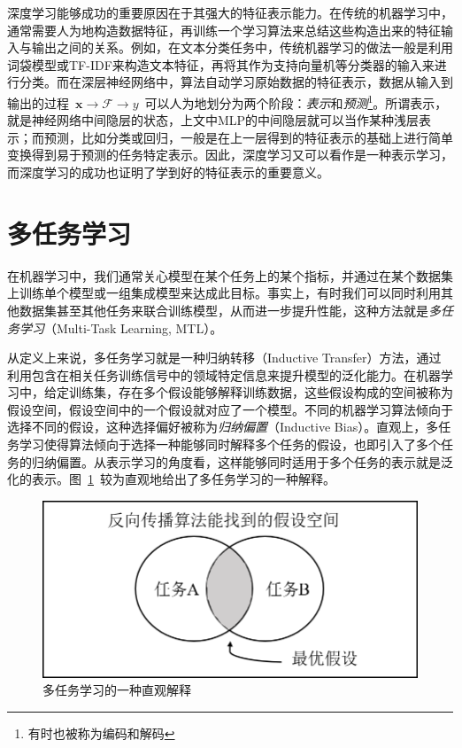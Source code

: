 深度学习能够成功的重要原因在于其强大的特征表示能力。在传统的机器学习中，通常需要人为地构造数据特征，再训练一个学习算法来总结这些构造出来的特征输入与输出之间的关系。例如，在文本分类任务中，传统机器学习的做法一般是利用词袋模型或TF-IDF来构造文本特征，再将其作为支持向量机等分类器的输入来进行分类。而在深层神经网络中，算法自动学习原始数据的特征表示，数据从输入到输出的过程~$\mathbf{x}\to \mathcal{F} \to y$~可以人为地划分为两个阶段：\emph{表示}和\emph{预测}\footnote{有时也被称为编码和解码}。所谓表示，就是神经网络中间隐层的状态，上文中MLP的中间隐层就可以当作某种浅层表示；而预测，比如分类或回归，一般是在上一层得到的特征表示的基础上进行简单变换得到易于预测的任务特定表示。因此，深度学习又可以看作是一种表示学习，而深度学习的成功也证明了学到好的特征表示的重要意义。

\section{多任务学习}
\label{sec:mtl}
在机器学习中，我们通常关心模型在某个任务上的某个指标，并通过在某个数据集上训练单个模型或一组集成模型来达成此目标。事实上，有时我们可以同时利用其他数据集甚至其他任务来联合训练模型，从而进一步提升性能，这种方法就是\emph{多任务学习}（Multi-Task Learning, MTL）。

从定义上来说，多任务学习就是一种归纳转移（Inductive Transfer）方法，通过利用包含在相关任务训练信号中的领域特定信息来提升模型的泛化能力\cite{Caruana1997}。在机器学习中，给定训练集，存在多个假设能够解释训练数据，这些假设构成的空间被称为假设空间，假设空间中的一个假设就对应了一个模型。不同的机器学习算法倾向于选择不同的假设，这种选择偏好被称为\emph{归纳偏置}（Inductive Bias）。直观上，多任务学习使得算法倾向于选择一种能够同时解释多个任务的假设，也即引入了多个任务的归纳偏置。从表示学习的角度看，这样能够同时适用于多个任务的表示就是泛化的表示。图~\ref{fig:mtl_int}~较为直观地给出了多任务学习的一种解释。

\begin{figure}[htb]
	\centering
	\includegraphics[scale=0.55]{mtl_int.png}
	\caption{多任务学习的一种直观解释}
	\label{fig:mtl_int}
\end{figure}

